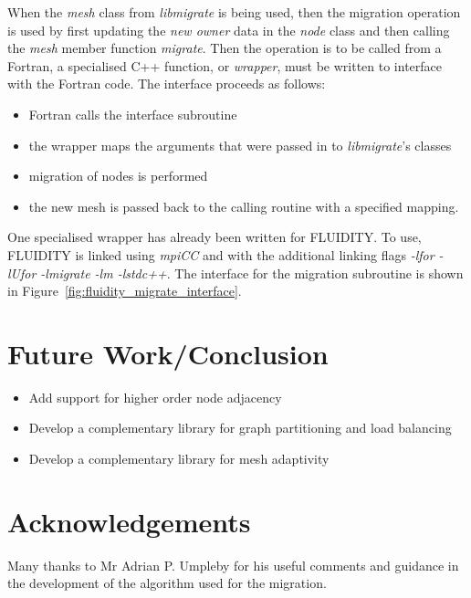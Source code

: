 \documentclass[11pt]{article}
\begin{document}
When the {\it mesh} class from {\it libmigrate} is being used, then
the migration operation is used by first updating the {\it new owner}
data in the {\it node} class and then calling the {\it mesh} member
function {\it migrate}. Then the operation is to be called from a
Fortran, a specialised C++ function, or {\it wrapper}, must be written
to interface with the Fortran code. The interface proceeds as follows:
\begin{itemize}
\item Fortran calls the interface subroutine
\item the wrapper maps the arguments that were passed in to {\it
libmigrate}'s classes
\item migration of nodes is performed
\item the new mesh is passed back to the calling routine with a
specified mapping.
\end{itemize}

One specialised wrapper has already been written for FLUIDITY. To use,
FLUIDITY is linked using {\it mpiCC} and with the additional linking
flags {\it -lfor -lUfor -lmigrate -lm -lstdc++}. The interface for the
migration subroutine is shown in Figure~\ref{fig:fluidity_migrate_interface}.

\section{Future Work/Conclusion}
\begin{itemize}
\item Add support for higher order node adjacency
\item Develop a complementary library for graph partitioning and load
balancing
\item Develop a complementary library for mesh adaptivity
\end{itemize}

\section{Acknowledgements}
Many thanks to Mr Adrian P. Umpleby for his useful comments and
guidance in the development of the algorithm used for the migration.



\end{document}
